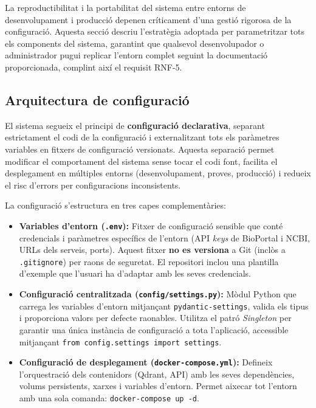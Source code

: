 \documentclass[CAT]{TFUOC}%
\begin{document}
La reproductibilitat i la portabilitat del sistema entre entorns de desenvolupament i producció depenen críticament d'una gestió rigorosa de la configuració. Aquesta secció descriu l'estratègia adoptada per parametritzar tots els components del sistema, garantint que qualsevol desenvolupador o administrador pugui replicar l'entorn complet seguint la documentació proporcionada, complint així el requisit RNF-5.

\subsection{Arquitectura de configuració}

El sistema segueix el principi de \textbf{configuració declarativa}, separant estrictament el codi de la configuració i externalitzant tots els paràmetres variables en fitxers de configuració versionats. Aquesta separació permet modificar el comportament del sistema sense tocar el codi font, facilita el desplegament en múltiples entorns (desenvolupament, proves, producció) i redueix el risc d'errors per configuracions inconsistents.

La configuració s'estructura en tres capes complementàries:

\begin{itemize}
    \item \textbf{Variables d'entorn (\texttt{.env}):} Fitxer de configuració sensible que conté credencials i paràmetres específics de l'entorn (API \textit{keys} de BioPortal i NCBI, URLs dels serveis, ports). Aquest fitxer \textbf{no es versiona} a Git (inclòs a \texttt{.gitignore}) per raons de seguretat. El repositori inclou una plantilla d'exemple que l'usuari ha d'adaptar amb les seves credencials.

    \item \textbf{Configuració centralitzada (\texttt{config/settings.py}):} Mòdul Python que carrega les variables d'entorn mitjançant \texttt{pydantic-settings}, valida els tipus i proporciona valors per defecte raonables. Utilitza el patró \textit{Singleton} per garantir una única instància de configuració a tota l'aplicació, accessible mitjançant \texttt{from config.settings import settings}.

    \item \textbf{Configuració de desplegament (\texttt{docker-compose.yml}):} Defineix l'orquestració dels contenidors (Qdrant, API) amb les seves dependències, volums persistents, xarxes i variables d'entorn. Permet aixecar tot l'entorn amb una sola comanda: \texttt{docker-compose up -d}.
\end{itemize}
\end{document}
